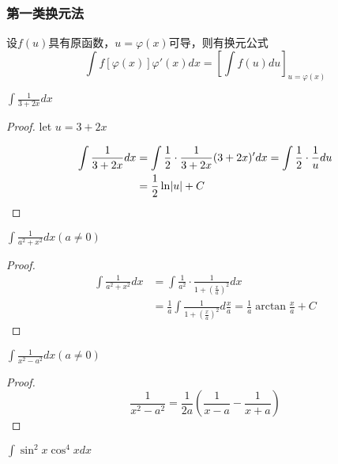 \documentclass[11pt]{article}
\begin{document}
\subsubsection{第一类换元法}
\label{sec:org00f1ae1}
\begin{theorem}[]
设\(f(u)\)具有原函数，\(u=\varphi(x)\)可导，则有换元公式
\begin{equation*}
\int f[\varphi(x)]\varphi'(x)dx=\left[\int f(u)du\right]_{u=\varphi(x)}
\end{equation*}
\end{theorem}

\begin{proposition}[]
\(\int\frac{1}{3+2x}dx\)
\end{proposition}

\begin{proof}
let \(u=3+2x\)

\begin{align*}
\int\frac{1}{3+2x}dx&=\int\frac{1}{2}\cdot\frac{1}{3+2x}(3+2x)'dx=\int\frac{1}{2}\cdot\frac{1}{u}du\\
&=\frac{1}{2}\ln\abs{u}+C
\end{align*}
\end{proof}

\begin{proposition}[]
\(\int\frac{1}{a^2+x^2}dx(a\neq0)\)
\end{proposition}

\begin{proof}
\begin{align*}
\int\frac{1}{a^2+x^2}dx&=\int\frac{1}{a^2}\cdot\frac{1}{1+(\frac{x}{a})^2}dx\\
&=\frac{1}{a}\int\frac{1}{1+(\frac{x}{a})^2}d\frac{x}{a}=\frac{1}{a}\arctan\frac{x}{a}+C
\end{align*}
\end{proof}

\begin{proposition}[]
\(\int\frac{1}{x^2-a^2}dx(a\neq0)\)
\end{proposition}

\begin{proof}
\begin{equation*}
\frac{1}{x^2-a^2}=\frac{1}{2a}(\frac{1}{x-a}-\frac{1}{x+a})
\end{equation*}
\end{proof}

\begin{proposition}[]
\(\int\sin^2x\cos^4xdx\)
\end{proposition}
\end{document}
